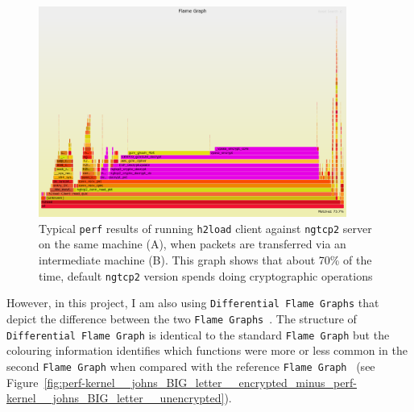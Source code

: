 \documentclass[12pt,a4paper,twoside,openright]{report}
\begin{document}
    \begin{figure}[H]
    \centering
    \includegraphics[width=0.9\textwidth]{figs/perf_results_of_h2load.png}
    \caption[Typical \texttt{perf} results of running \texttt{h2load} client against \texttt{ngtcp2} server on the same machine (A), when packets are transferred via an intermediate machine (B)]{Typical \texttt{perf} results of running \texttt{h2load} client against \texttt{ngtcp2} server on the same machine (A), when packets are transferred via an intermediate machine (B). This graph shows that about 70\% of the time, default \texttt{ngtcp2} version spends doing cryptographic operations} 
    \label{fig:perf_results_of_h2load}
    \end{figure}


However, in this project, I am also using \texttt{Differential Flame Graphs} that depict the difference between the two \texttt{Flame Graphs}~\cite{Differential_Flame_Graphs}.
The structure of \texttt{Differential Flame Graph} is identical to the standard \texttt{Flame Graph} but the colouring information identifies which functions were more or less common in the second \texttt{Flame Graph} when compared with the reference \texttt{Flame Graph}~\cite{Differential_Flame_Graphs} (see Figure~\ref{fig:perf-kernel__johns_BIG_letter__encrypted_minus_perf-kernel__johns_BIG_letter__unencrypted}).
\end{document}
